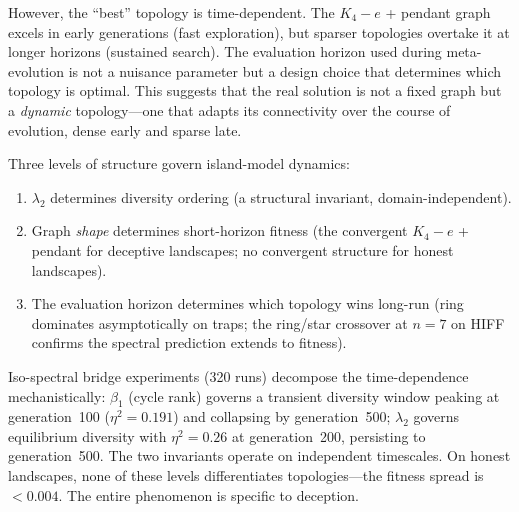\documentclass[sigconf,nonacm]{acmart}
\begin{document}
However, the ``best'' topology is time-dependent. The $K_4 - e$ +
pendant graph excels in early generations (fast exploration), but
sparser topologies overtake it at longer horizons (sustained search).
The evaluation horizon used during meta-evolution is not a nuisance
parameter but a design choice that determines which topology is
optimal. This suggests that the real solution is not a fixed graph
but a \emph{dynamic} topology---one that adapts its connectivity
over the course of evolution, dense early and sparse late.

Three levels of structure govern island-model dynamics:
\begin{enumerate}
\item $\lambda_2$ determines diversity ordering (a structural invariant,
  domain-independent).
\item Graph \emph{shape} determines short-horizon fitness (the
  convergent $K_4 - e$ + pendant for deceptive landscapes; no
  convergent structure for honest landscapes).
\item The evaluation horizon determines which topology wins long-run
  (ring dominates asymptotically on traps; the ring/star crossover at
  $n = 7$ on HIFF confirms the spectral prediction extends to fitness).
\end{enumerate}

Iso-spectral bridge experiments (320 runs) decompose the time-dependence
mechanistically: $\beta_1$ (cycle rank) governs a transient diversity
window peaking at generation~100 ($\eta^2 = 0.191$) and collapsing by
generation~500; $\lambda_2$ governs equilibrium diversity with
$\eta^2 = 0.26$ at generation~200, persisting to generation~500.
The two invariants operate on independent timescales.
On honest landscapes, none of these levels differentiates topologies---the
fitness spread is $< 0.004$. The entire phenomenon is specific to
deception.



\end{document}
